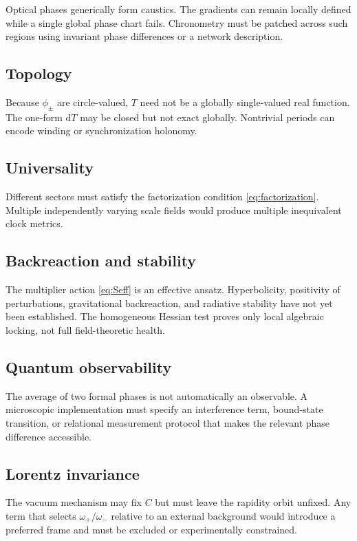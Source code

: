 \documentclass[11pt,a4paper]{article}
\newcommand{\dd}{\mathrm{d}}
\newcommand{\Ccross}{C}
\begin{document}
Optical phases generically form caustics. The gradients can remain locally defined while a single global phase chart fails. Chronometry must be patched across such regions using invariant phase differences or a network description.

\subsection{Topology}

Because $\phi_\pm$ are circle-valued, $T$ need not be a globally single-valued real function. The one-form $\dd T$ may be closed but not exact globally. Nontrivial periods can encode winding or synchronization holonomy.

\subsection{Universality}

Different sectors must satisfy the factorization condition \eqref{eq:factorization}. Multiple independently varying scale fields would produce multiple inequivalent clock metrics.

\subsection{Backreaction and stability}

The multiplier action \eqref{eq:Seff} is an effective ansatz. Hyperbolicity, positivity of perturbations, gravitational backreaction, and radiative stability have not yet been established. The homogeneous Hessian test proves only local algebraic locking, not full field-theoretic health.

\subsection{Quantum observability}

The average of two formal phases is not automatically an observable. A microscopic implementation must specify an interference term, bound-state transition, or relational measurement protocol that makes the relevant phase difference accessible.

\subsection{Lorentz invariance}

The vacuum mechanism may fix $\Ccross$ but must leave the rapidity orbit unfixed. Any term that selects $\omega_+/\omega_-$ relative to an external background would introduce a preferred frame and must be excluded or experimentally constrained.
\end{document}
